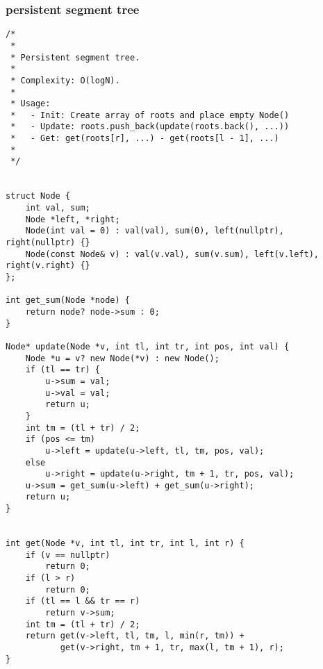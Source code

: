 \subsubsection{persistent segment tree}
\begin{lstlisting}
/*
 *
 * Persistent segment tree.
 *
 * Complexity: O(logN).
 *
 * Usage:
 *   - Init: Create array of roots and place empty Node()
 *   - Update: roots.push_back(update(roots.back(), ...))
 *   - Get: get(roots[r], ...) - get(roots[l - 1], ...)
 *
 */


struct Node {
    int val, sum;
    Node *left, *right;
    Node(int val = 0) : val(val), sum(0), left(nullptr), right(nullptr) {}
    Node(const Node& v) : val(v.val), sum(v.sum), left(v.left), right(v.right) {}
};

int get_sum(Node *node) {
    return node? node->sum : 0;
}

Node* update(Node *v, int tl, int tr, int pos, int val) {
    Node *u = v? new Node(*v) : new Node();
    if (tl == tr) {
        u->sum = val;
        u->val = val;
        return u;
    }
    int tm = (tl + tr) / 2;
    if (pos <= tm)
        u->left = update(u->left, tl, tm, pos, val);
    else
        u->right = update(u->right, tm + 1, tr, pos, val);
    u->sum = get_sum(u->left) + get_sum(u->right);
    return u;
}


int get(Node *v, int tl, int tr, int l, int r) {
    if (v == nullptr)
        return 0;
    if (l > r)
        return 0;
    if (tl == l && tr == r)
        return v->sum;
    int tm = (tl + tr) / 2;
    return get(v->left, tl, tm, l, min(r, tm)) +
           get(v->right, tm + 1, tr, max(l, tm + 1), r);
}

\end{lstlisting}
